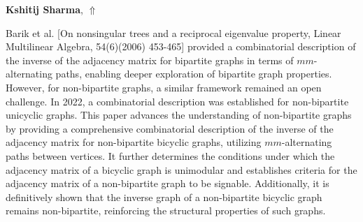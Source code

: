 \documentclass[ILAS2025-program.tex]{subfiles}
\begin{document}
\hypertarget{down0093}{}\begin{ilasabstract}
    
\textbf{Kshitij Sharma},  \hfill \hyperlink{up0093}{$\Uparrow$}
    
    
\mtskip
    Barik et al. [On nonsingular trees and a reciprocal eigenvalue property, Linear Multilinear Algebra, 54(6)(2006) 453-465] provided a combinatorial description of the inverse of the adjacency matrix for bipartite graphs in terms of $mm$-alternating paths, enabling deeper exploration of bipartite graph properties. However, for non-bipartite graphs, a similar framework remained an open challenge. In 2022, a combinatorial description was established for non-bipartite unicyclic graphs.
This paper advances the understanding of non-bipartite graphs by providing a comprehensive combinatorial description of the inverse of the adjacency matrix for non-bipartite bicyclic graphs, utilizing $mm$-alternating paths between vertices. It further determines the conditions under which the adjacency matrix of a bicyclic graph is unimodular and establishes criteria for the adjacency matrix of a non-bipartite graph to be signable. Additionally, it is definitively shown that the inverse graph of a non-bipartite bicyclic graph remains non-bipartite, reinforcing the structural properties of such graphs.


\end{ilasabstract}
    
\end{document}
